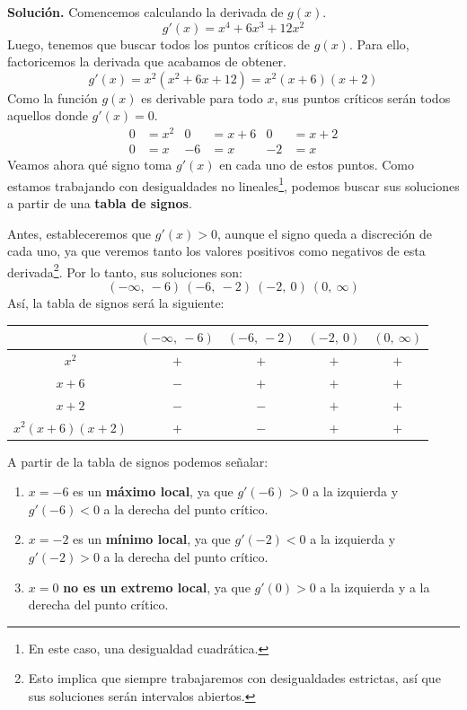 \documentclass[12pt]{article}
\begin{document}
\textbf{Solución.} \quad Comencemos calculando la derivada de $g(x)$.
\[
	g'(x) = x^{4} + 6x^{3} + 12x^{2}
\]
Luego, tenemos que buscar todos los puntos críticos de $g(x)$. Para ello, factoricemos la derivada que acabamos de obtener.
\[
g'(x) = x^{2}(x^{2} + 6x + 12) = x^{2}(x + 6)(x + 2)
\]
Como la función $g(x)$ es derivable para todo $x$, sus puntos críticos serán todos aquellos donde $g'(x) = 0$.
\begin{align*}
0 &= x^{2} & 0 &= x + 6 & 0 &= x + 2 \\
0 &= x & -6 &= x & -2 &= x
\end{align*}
Veamos ahora qué signo toma $g'(x)$ en cada uno de estos puntos. Como estamos trabajando con desigualdades no lineales\footnote{En este caso, una desigualdad cuadrática.}, podemos buscar sus soluciones a partir de una \textbf{tabla de signos}.

Antes, estableceremos que $g'(x) > 0$, aunque el signo queda a discreción de cada uno, ya que veremos tanto los valores positivos como negativos de esta derivada\footnote{Esto implica que siempre trabajaremos con desigualdades estrictas, así que sus soluciones serán intervalos abiertos.}. Por lo tanto, sus soluciones son:
\[
(-\infty, \ -6) \ (-6, \ -2) \ (-2, \ 0) \ (0, \ \infty)
\]
Así, la tabla de signos será la siguiente:

\begin{table}[hbt!]
\centering

{\renewcommand{\arraystretch}{1.3}
\begin{tabular}{c c c c c}
\hline
 & $(-\infty, \ -6)$ & $(-6, \ -2)$ & $(-2, \ 0)$ & $(0, \ \infty)$ \\
\hline
$x^{2}$ & $+$ & $+$ & $+$ & $+$ \\
$x + 6$ & $-$ & $+$ & $+$ & $+$ \\
$x + 2$ & $-$ & $-$ & $+$ & $+$ \\
\hline
$x^{2}(x + 6)(x + 2)$ & $+$ & $-$ & $+$ & $+$ \\
\hline
\end{tabular}
}
\end{table}

\newpage

A partir de la tabla de signos podemos señalar:

\begin{enumerate}
\item $x = -6$ es un \textbf{máximo local}, ya que $g'(-6) > 0$ a la izquierda y $g'(-6) < 0$ a la derecha del punto crítico.

\item $x = -2$ es un \textbf{mínimo local}, ya que $g'(-2) < 0$ a la izquierda y $g'(-2) > 0$ a la derecha del punto crítico.

\item $x = 0$ \textbf{no es un extremo local}, ya que $g'(0) > 0$ a la izquierda y a la derecha del punto crítico.
\end{enumerate}
\end{document}
